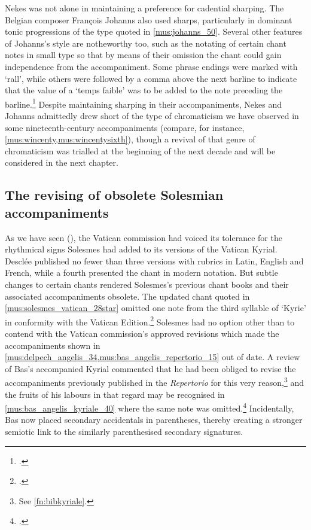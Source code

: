 Nekes was not alone in maintaining a preference for cadential sharping.
The Belgian composer François Johanns also used sharps, particularly in dominant \rightarrow{} tonic progressions of the type quoted in \cref{mus:johanns_50}.
Several other features of Johanns's style are notheworthy too, such as the notating of certain chant notes in small type so that by means of their omission the chant could gain independence from the accompaniment.
Some phrase endings were marked with `rall', while others were followed by a comma above the next barline to indicate that the value of a `temps faible' was to be added to the note preceding the barline.\footcite[pp.~iii--iv, 50]{JohannsAccompagnementsKyrialeou1909}
Despite maintaining sharping in their accompaniments, Nekes and Johanns admittedly drew short of the type of chromaticism we have observed in some nineteenth-century accompaniments (compare, for instance, \cref{mus:wincenty,mus:wincentysixth}), though a revival of that genre of chromaticism was trialled at the beginning of the next decade and will be considered in the next chapter.

\subsection{The revising of obsolete Solesmian accompaniments}
As we have seen (), the Vatican commission had voiced its tolerance for the rhythmical signs Solesmes had added to its versions of the Vatican Kyrial.
Desclée published no fewer than three versions with rubrics in Latin, English and French, while a fourth presented the chant in modern notation.
But subtle changes to certain chants rendered Solesmes's previous chant books and their associated accompaniments obsolete.
The updated chant quoted in \cref{mus:solesmes_vatican_28star} omitted one note from the third syllable of `Kyrie' in conformity with the Vatican Edition.\footcite[28*]{KyrialeseuOrdinarium1905}
Solesmes had no option other than to contend with the Vatican commission's approved revisions which made the accompaniments shown in \cref{mus:delpech_angelis_34,mus:bas_angelis_repertorio_15} out of date.
A review of Bas's accompanied Kyrial commented that he had been obliged to revise the accompaniments previously published in the \emph{Repertorio} for this very reason,\footnote{See \cref{fn:bibkyriale}.} and the fruits of his labours in that regard may be recognised in \cref{mus:bas_angelis_kyriale_40} where the same note was omitted.\footcite[40]{BasKyrialeseuordinarium1906}
Incidentally, Bas now placed secondary accidentals in parentheses, thereby creating a stronger semiotic link to the similarly parenthesised secondary signatures.

